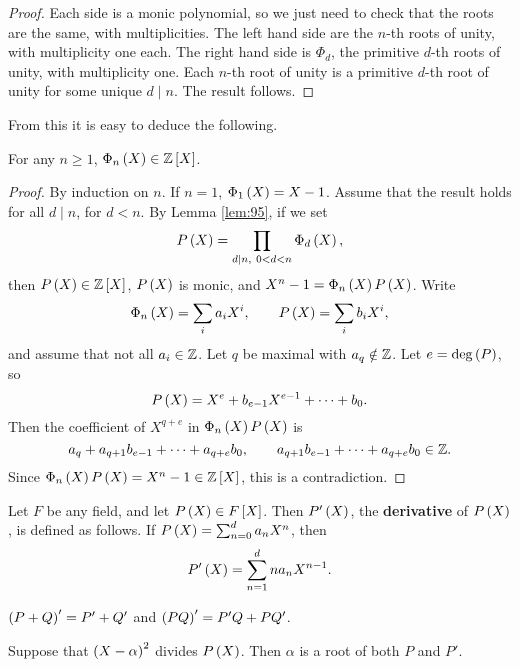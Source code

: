 \begin{proof}
Each side is a monic polynomial, so we just need to check that the roots are the same, with multiplicities. The left hand side are the $ n $-th roots of unity, with multiplicity one each. The right hand side is $ \Phi_d $, the primitive $ d $-th roots of unity, with multiplicity one. Each $ n $-th root of unity is a primitive $ d $-th root of unity for some unique $ d \mid n $. The result follows.
\end{proof}

From this it is easy to deduce the following.

\begin{lemma}
For any $ n \ge 1 $, $ \Phi_n\br{X} \in \Z\sbr{X} $.
\end{lemma}

\begin{proof}
By induction on $ n $. If $ n = 1 $, $ \Phi_1\br{X} = X - 1 $. Assume that the result holds for all $ d \mid n $, for $ d < n $. By Lemma \ref{lem:95}, if we set
$$ P\br{X} = \prod_{d \mid n, \ 0 < d < n} \Phi_d\br{X}, $$
then $ P\br{X} \in \Z\sbr{X} $, $ P\br{X} $ is monic, and $ X^n - 1 = \Phi_n\br{X}P\br{X} $. Write
$$ \Phi_n\br{X} = \sum_i a_iX^i, \qquad P\br{X} = \sum_i b_iX^i, $$
and assume that not all $ a_i \in \mathbb{Z} $. Let $ q $ be maximal with $ a_q \notin \mathbb{Z} $. Let $ e = \deg\br{P} $, so
$$ P\br{X} = X^e + b_{e - 1}X^{e - 1} + \dots + b_0. $$
Then the coefficient of $ X^{q + e} $ in $ \Phi_n\br{X}P\br{X} $ is
$$ a_q + a_{q + 1}b_{e - 1} + \dots + a_{q + e}b_0, \qquad a_{q + 1}b_{e - 1} + \dots + a_{q + e}b_0 \in \mathbb{Z}. $$
Since $ \Phi_n\br{X}P\br{X} = X^n - 1 \in \Z\sbr{X} $, this is a contradiction.
\end{proof}

\pagebreak

\begin{definition}
Let $ F $ be any field, and let $ P\br{X} \in F\sbr{X} $. Then $ P'\br{X} $, the \textbf{derivative} of $ P\br{X} $, is defined as follows. If $ P\br{X} = \sum_{n = 0}^d a_nX^n $, then
$$ P'\br{X} = \sum_{n = 1}^d na_nX^{n - 1}. $$
\end{definition}

\begin{note*}
$ \br{P + Q}' = P' + Q' $ and $ \br{PQ}' = P'Q + PQ' $.
\end{note*}

\begin{lemma}
\label{lem:98}
Suppose that $ \br{X - \alpha}^2 $ divides $ P\br{X} $. Then $ \alpha $ is a root of both $ P $ and $ P' $.
\end{lemma}


